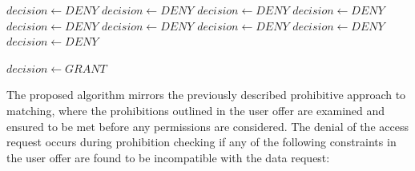 \begin{algorithm}
\begin{algorithmic}
        $decision \gets DENY$
    \EndIf
            $decision \gets DENY$
        \EndIf
    \EndIf
            $decision \gets DENY$
        \EndIf
    \EndIf
                $decision \gets DENY$
            \EndIf
                $decision \gets DENY$
            \EndIf
                $decision \gets DENY$
            \EndIf
                $decision \gets DENY$
            \EndIf
                $decision \gets DENY$
            \EndIf
                $decision \gets DENY$
            \EndIf
        \EndIf 
    \EndFor 
\EndFor

    $decision \gets GRANT$
\EndIf
\end{algorithmic}
\end{algorithm}

The proposed algorithm mirrors the previously described prohibitive approach to matching, where the prohibitions outlined in the user offer are examined and ensured to be met before any permissions are considered.
The denial of the access request occurs during prohibition checking if any of the following constraints in the user offer are found to be incompatible with the data request:

